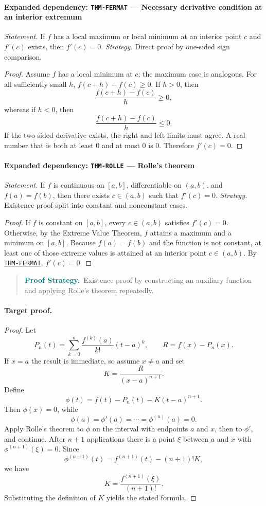 \documentclass[10pt]{article}
\newcommand{\pidraw}[1]{\begingroup\urlstyle{tt}\nolinkurl{#1}\endgroup}
\newcommand{\pidref}[1]{\hyperref[prf:#1]{\pidraw{#1}}}
\newcommand{\pid}[1]{\pidref{#1}}
\theoremstyle{definition}
\theoremstyle{remark}
\newenvironment{proofstrategy}
{\begin{quote}\small\noindent\textbf{\textcolor{teal}{Proof Strategy.}}\ }
{\end{quote}}
\begin{document}
\paragraph{Expanded dependency: \pidraw{THM-FERMAT} --- Necessary derivative condition at an interior extremum}
\textit{Statement.} If $f$ has a local maximum or local minimum at an interior point $c$ and $f'(c)$ exists, then $f'(c)=0$.
\textit{Strategy.} Direct proof by one-sided sign comparison.
\begin{proof}Assume $f$ has a local minimum at $c$; the maximum case is analogous.
For all sufficiently small $h$,
$f(c+h)-f(c)\ge0$. If $h>0$, then
\[
\frac{f(c+h)-f(c)}{h}\ge0,
\]
whereas if $h<0$, then
\[
\frac{f(c+h)-f(c)}{h}\le0.
\]
If the two-sided derivative exists, the right and left limits must agree.
A real number that is both at least $0$ and at most $0$ is $0$.
Therefore $f'(c)=0$.\end{proof}

\paragraph{Expanded dependency: \pidraw{THM-ROLLE} --- Rolle's theorem}
\textit{Statement.} If $f$ is continuous on $[a,b]$, differentiable on $(a,b)$, and $f(a)=f(b)$, then there exists $c\in(a,b)$ such that $f'(c)=0$.
\textit{Strategy.} Existence proof split into constant and nonconstant cases.
\begin{proof}If $f$ is constant on $[a,b]$, every $c\in(a,b)$ satisfies $f'(c)=0$.
Otherwise, by the Extreme Value Theorem, $f$ attains a maximum and a minimum
on $[a,b]$. Because $f(a)=f(b)$ and the function is not constant, at least one
of those extreme values is attained at an interior point $c\in(a,b)$.
By \pid{THM-FERMAT}, $f'(c)=0$.\end{proof}

\begin{proofstrategy}Existence proof by constructing an auxiliary function and applying Rolle's theorem repeatedly.\end{proofstrategy}

\paragraph{Target proof.}

\begin{proof}

Let
\[
P_n(t)=\sum_{k=0}^{n}\frac{f^{(k)}(a)}{k!}(t-a)^k,
\qquad
R=f(x)-P_n(x).
\]
If $x=a$ the result is immediate, so assume $x\ne a$ and set
\[
K=\frac{R}{(x-a)^{n+1}}.
\]
Define
\[
\phi(t)=f(t)-P_n(t)-K(t-a)^{n+1}.
\]
Then $\phi(x)=0$, while
\[
\phi(a)=\phi'(a)=\cdots=\phi^{(n)}(a)=0.
\]
Apply Rolle's theorem to $\phi$ on the interval with endpoints $a$ and $x$,
then to $\phi'$, and continue. After $n+1$ applications there is a point
$\xi$ between $a$ and $x$ with $\phi^{(n+1)}(\xi)=0$. Since
\[
\phi^{(n+1)}(t)=f^{(n+1)}(t)-(n+1)!K,
\]
we have
\[
K=\frac{f^{(n+1)}(\xi)}{(n+1)!}.
\]
Substituting the definition of $K$ yields the stated formula.

\end{proof}
\end{document}
